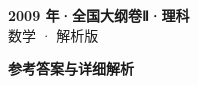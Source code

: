 \documentclass[zihao=-4, a4paper]{ctexart}
\begin{document}
\begin{center}
  {\Large\bfseries 2009 年·全国大纲卷Ⅱ·理科}\\[4pt]
  {\large 数学 · 解析版}
\end{center}
\medskip
{}

\clearpage
{}
\begin{center}{\Large\bfseries 参考答案与详细解析}\end{center}
\medskip

\end{document}
